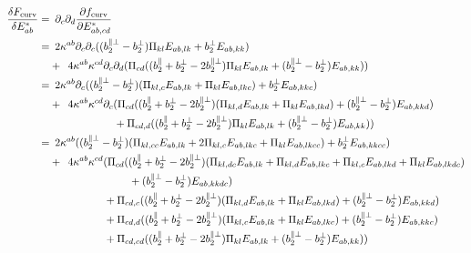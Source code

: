 \documentclass[11pt]{article}
\begin{document}
\begin{align}
    \fdv{F_\text{curv}}{E_{ab}^*} =&\enspace \pp_c\pp_d \pdv{f_\text{curv}}{E_{ab,cd}^*} \\
    =&\enspace 2\kappa^{ab} \pp_c\pp_c ((b_2^{\parallel\perp}-b_2^\perp)\Pi_{kl}E_{ab,lk}+b_2^\perp E_{ab,kk}) \\
    &+\enspace 4\kappa^{ab}\kappa^{cd} \pp_c \pp_d (\Pi_{cd} ((b_2^\parallel + b_2^\perp - 2b_2^{\parallel\perp})\Pi_{kl}E_{ab,lk} + (b_2^{\parallel\perp}-b_2^\perp)E_{ab,kk})) \nonumber \\
    =&\enspace 2\kappa^{ab} \pp_c ((b_2^{\parallel\perp}-b_2^\perp)(\Pi_{kl,c}E_{ab,lk}+\Pi_{kl}E_{ab,lkc}) + b_2^\perp E_{ab,kkc}) \\
    &+\enspace 4\kappa^{ab}\kappa^{cd} \pp_c (\Pi_{cd} ((b_2^\parallel + b_2^\perp - 2b_2^{\parallel\perp})(\Pi_{kl,d}E_{ab,lk}+\Pi_{kl}E_{ab,lkd}) + (b_2^{\parallel\perp}-b_2^\perp)E_{ab,kkd}) \nonumber \\
    &\enspace\phantom{+\enspace 4\kappa^{ab}\kappa^{cd} \pp_c} + \Pi_{cd,d} ((b_2^\parallel + b_2^\perp - 2b_2^{\parallel\perp})\Pi_{kl}E_{ab,lk} + (b_2^{\parallel\perp}-b_2^\perp)E_{ab,kk})) \nonumber \\
    =&\enspace 2\kappa^{ab} ((b_2^{\parallel\perp}-b_2^\perp)(\Pi_{kl,cc}E_{ab,lk}+2\Pi_{kl,c}E_{ab,lkc}+\Pi_{kl}E_{ab,lkcc}) + b_2^\perp E_{ab,kkcc}) \\
    &+\enspace 4\kappa^{ab}\kappa^{cd} (\Pi_{cd} ((b_2^\parallel + b_2^\perp - 2b_2^{\parallel\perp})(\Pi_{kl,dc}E_{ab,lk}+\Pi_{kl,d}E_{ab,lkc}+\Pi_{kl,c}E_{ab,lkd}+\Pi_{kl}E_{ab,lkdc}) \nonumber \\
    &\enspace\phantom{+\enspace 4\kappa^{ab}\kappa^{cd} (\Pi_{cd} (} + (b_2^{\parallel\perp}-b_2^\perp)E_{ab,kkdc}) \nonumber \\
    &\enspace\phantom{+\enspace 4\kappa^{ab}\kappa^{cd}} + \Pi_{cd,c} ((b_2^\parallel + b_2^\perp - 2b_2^{\parallel\perp})(\Pi_{kl,d}E_{ab,lk}+\Pi_{kl}E_{ab,lkd}) + (b_2^{\parallel\perp}-b_2^\perp)E_{ab,kkd}) \nonumber \\
    &\enspace\phantom{+\enspace 4\kappa^{ab}\kappa^{cd}} + \Pi_{cd,d} ((b_2^\parallel + b_2^\perp - 2b_2^{\parallel\perp})(\Pi_{kl,c}E_{ab,lk}+\Pi_{kl}E_{ab,lkc}) + (b_2^{\parallel\perp}-b_2^\perp)E_{ab,kkc}) \nonumber \\
    &\enspace\phantom{+\enspace 4\kappa^{ab}\kappa^{cd}} + \Pi_{cd,cd} ((b_2^\parallel + b_2^\perp - 2b_2^{\parallel\perp})\Pi_{kl}E_{ab,lk} + (b_2^{\parallel\perp}-b_2^\perp)E_{ab,kk})) \nonumber \\

\end{align}
\end{document}
